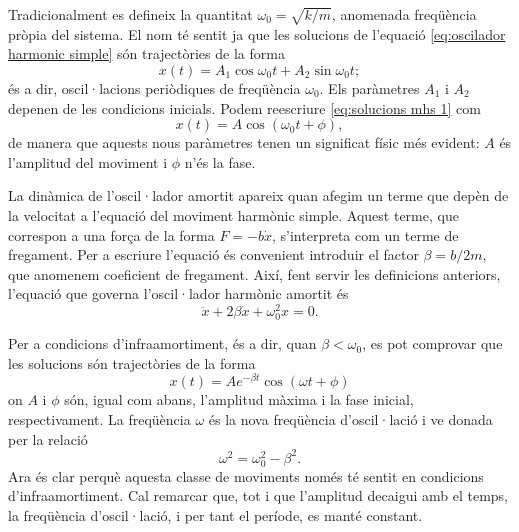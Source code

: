 \documentclass[12pt,a4paper]{article}
\begin{document}
Tradicionalment es defineix la quantitat \( \omega_0 = \sqrt{k / m} \), anomenada freqüència pròpia del sistema. El nom té sentit ja que les solucions de l'equació \ref{eq:oscilador harmonic simple} són trajectòries de la forma
\begin{equation}
  x(t) = A_1\cos{\omega_0 t} + A_2\sin{\omega_0 t}; \label{eq:solucions mhs 1}
\end{equation}
és a dir, oscil·lacions periòdiques de freqüència \( \omega_0 \). Els paràmetres \( A_1 \) i \( A_2 \) depenen de les condicions inicials. Podem reescriure \ref{eq:solucions mhs 1} com
\begin{equation}
  x(t) = A\cos({\omega_0 t + \phi}), \label{eq:solucions mhs 2}
\end{equation}
de manera que aquests nous paràmetres tenen un significat físic més evident: \( A \) és l'amplitud del moviment i \( \phi \) n'és la fase.

La dinàmica de l'oscil·lador amortit apareix quan afegim un terme que depèn de la velocitat a l'equació del moviment harmònic simple. Aquest terme, que correspon a una força de la forma \( F = -b\dot{x} \), s'interpreta com un terme de fregament. Per a escriure l'equació és convenient introduir el factor \( \beta = b/2m \), que anomenem coeficient de fregament. Així, fent servir les definicions anteriors, l'equació que governa l'oscil·lador harmònic amortit és
\begin{equation}
  \ddot{x} + 2\beta \dot{x} + \omega_0^2 x = 0. \label{eq:oscilador harmonic amortit}
\end{equation}

Per a condicions d'infraamortiment, és a dir, quan \( \beta < \omega_0 \), es pot comprovar que les solucions són trajectòries de la forma
\begin{equation}
  x(t) = Ae^{-\beta t}\cos({\omega t + \phi}) \label{eq:solucions mha}
\end{equation}
on \( A \) i \( \phi \) són, igual com abans, l'amplitud màxima i la fase inicial, respectivament. La freqüència \( \omega \) és la nova freqüència d'oscil·lació i ve donada per la relació
\begin{equation}
  \omega^2 = \omega_0^2 - \beta^2. \label{eq:nova frequencia}
\end{equation}
Ara és clar perquè aquesta classe de moviments només té sentit en condicions d'infraamortiment. Cal remarcar que, tot i que l'amplitud decaigui amb el temps, la freqüència d'oscil·lació, i per tant el període, es manté constant. 
\end{document}
